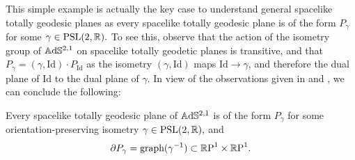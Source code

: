 This simple example is actually the key case to understand general spacelike totally geodesic planes as every spacelike totally geodesic plane is of the form $P_\gamma$ for some $\gamma\in\text{PSL}(2,\mathbb{R}).$ To see this, observe that the action of the isometry group of $\mathbb{A}\mathrm{d}\mathbb{S}^{2,1}$ on spacelike totally geodetic planes is transitive, and that $P_\gamma=(\gamma,\text{Id})\cdot P_{\text{Id}}$ as the isometry $(\gamma,\text{Id})$ maps $\text{Id}\to\gamma$, and therefore the dual plane of $\text{Id}$ to the dual plane of $\gamma.$ In view of the observations given in  and , we can conclude the following: 
\begin{lemma}\label{32}
    Every spacelike totally geodesic plane of $\mathbb{A}\mathrm{d}\mathbb{S}^{2,1}$ is of the form $P_\gamma$ for some orientation-preserving isometry $\gamma\in\text{PSL}(2,\mathbb{R}),$ and 
    \[
        \partial P_\gamma=\text{graph}(\gamma^{-1})\subset\mathbb{R}\text{P}^1\times\mathbb{R}\text{P}^1.
    \]
\end{lemma}
